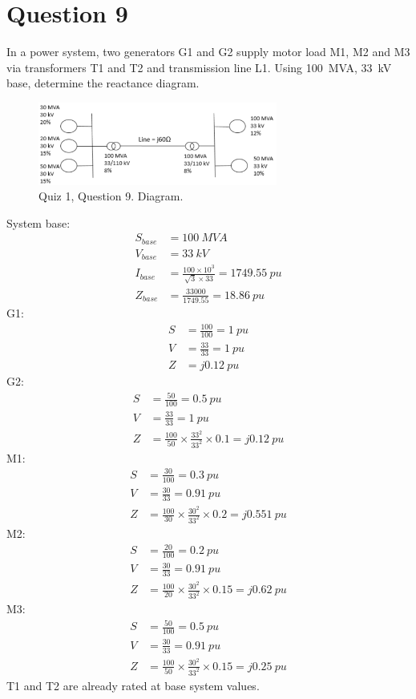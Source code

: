 \section{Question 9}
In a power system, two generators G1 and G2 supply motor load M1, M2 and M3 via transformers T1 and T2 and transmission line L1. Using \SI{100}{MVA}, \SI{33}{kV} base, determine the reactance diagram. 
\begin{figure}[H]
    \centering
    \includegraphics[width = 0.7\textwidth]{img/figure149.png}
    \caption{Quiz 1, Question 9. Diagram.}
\end{figure}
System base:
\begin{align}
    S_{base} &= \SI{100}{MVA}\\
    V_{base} &= \SI{33}{kV}\\
    I_{base} &= \frac{100\times 10^3}{\sqrt{3}\times 33} = \SI{1749.55}{pu}\\
    Z_{base} &= \frac{33000}{1749.55} = \SI{18.86}{pu}
\end{align}
G1:
\begin{align}
    S &= \frac{100}{100} = \SI{1}{pu}\\
    V &= \frac{33}{33} = \SI{1}{pu}\\
    Z &= j\SI{0.12}{pu}
\end{align}
G2:
\begin{align}
    S &= \frac{50}{100} = \SI{0.5}{pu}\\
    V &= \frac{33}{33} = \SI{1}{pu}\\
    Z &= \frac{100}{50}\times \frac{33^2}{33^2}\times 0.1 = j\SI{0.12}{pu}
\end{align}
M1:
\begin{align}
    S &= \frac{30}{100} = \SI{0.3}{pu}\\
    V &= \frac{30}{33} = \SI{0.91}{pu}\\
    Z &= \frac{100}{30}\times \frac{30^2}{33^2}\times 0.2 = j\SI{0.551}{pu}
\end{align}
M2:
\begin{align}
    S &= \frac{20}{100} = \SI{0.2}{pu}\\
    V &= \frac{30}{33} = \SI{0.91}{pu}\\
    Z &= \frac{100}{20}\times \frac{30^2}{33^2}\times 0.15 = j\SI{0.62}{pu}
\end{align}
M3:
\begin{align}
    S &= \frac{50}{100} = \SI{0.5}{pu}\\
    V &= \frac{30}{33} = \SI{0.91}{pu}\\
    Z &= \frac{100}{50}\times \frac{30^2}{33^2}\times 0.15 = j\SI{0.25}{pu}
\end{align}
T1 and T2 are already rated at base system values.

